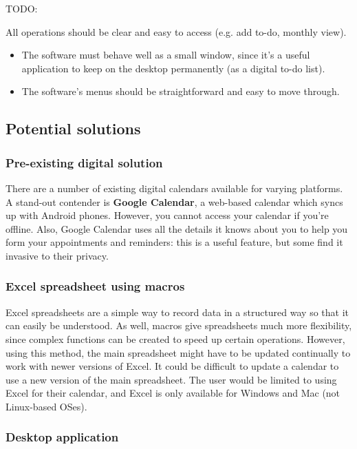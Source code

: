 TODO:

All operations should be clear and easy to access (e.g. add to-do,
monthly view).

\begin{itemize}
  \item The software must behave well as a small window, since it's a useful
        application to keep on the desktop permanently (as a digital to-do
        list).
  \item The software's menus should be straightforward and easy to move through.
\end{itemize}


\subsection{Potential solutions}
\subsubsection{Pre-existing digital solution}

There are a number of existing digital calendars available for varying
platforms. A stand-out contender is \textbf{Google Calendar}, a web-based
calendar which syncs up with Android phones. However, you cannot access your
calendar if you're offline. Also, Google Calendar uses all the details it knows
about you to help you form your appointments and reminders: this is a useful
feature, but some find it invasive to their privacy.


\subsubsection{Excel spreadsheet using macros}

Excel spreadsheets are a simple way to record data in a structured way so that
it can easily be understood. As well, macros give spreadsheets much more
flexibility, since complex functions can be created to speed up certain
operations. However, using this method, the main spreadsheet might have to be
updated continually to work with newer versions of Excel. It could be difficult
to update a calendar to use a new version of the main spreadsheet. The user
would be limited to using Excel for their calendar, and Excel is only available
for Windows and Mac (not Linux-based OSes).


\subsubsection{Desktop application}

